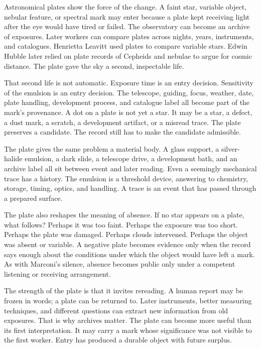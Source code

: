 Astronomical plates show the force of the change. A faint star, variable
object, nebular feature, or spectral mark may enter because a plate kept
receiving light after the eye would have tired or failed. The observatory can
become an archive of exposures. Later workers can compare plates across nights,
years, instruments, and catalogues. Henrietta Leavitt used plates to compare
variable stars. Edwin Hubble later relied on plate records of Cepheids
and nebulae to argue for cosmic distance. The plate gave the sky a second, inspectable life.

That second life is not automatic. Exposure time is an entry decision.
Sensitivity of the emulsion is an entry decision. The telescope, guiding,
focus, weather, date, plate handling, development process, and catalogue label
all become part of the mark's provenance. A dot on a plate is not yet a star.
It may be a star, a defect, a dust mark, a scratch, a development artifact, or
a misread trace. The plate preserves a candidate. The record still has to make
the candidate admissible.

The plate gives the same problem a material body. A glass support, a
silver-halide emulsion, a dark slide, a telescope drive, a development bath,
and an archive label all sit between event and later reading. Even a seemingly
mechanical trace has a history. The emulsion is a threshold device, answering
to chemistry, storage, timing, optics, and handling. A trace is an event that
has passed through a prepared surface.

The plate also reshapes the meaning of absence. If no star appears on a
plate, what follows? Perhaps it was too faint. Perhaps the exposure was too
short. Perhaps the plate was damaged. Perhaps clouds intervened. Perhaps the
object was absent or variable. A negative plate becomes evidence only when the
record says enough about the conditions under which the object would have
left a mark. As with Marconi's silence, absence becomes public only under a
competent listening or receiving arrangement.

The strength of the plate is that it invites rereading. A human report may be
frozen in words; a plate can be returned to. Later instruments, better
measuring techniques, and different questions can extract new information from
old exposures. That is why archives matter. The plate can become more useful
than its first interpretation. It may carry a mark whose significance was not
visible to the first worker. Entry has produced a durable object with future
surplus.

